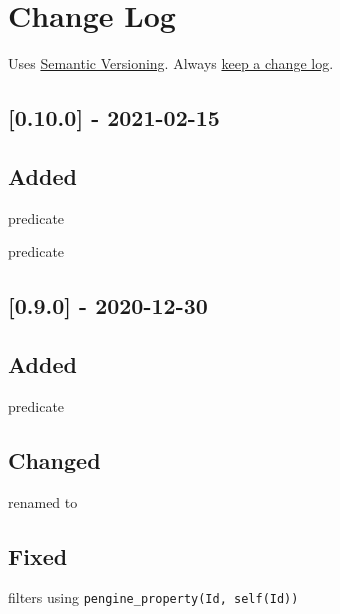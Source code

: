 \chapter{Change Log}

Uses \href{https://semver.org/}{Semantic Versioning}. Always \href{https://keepachangelog.com/en/1.0.0/}{keep a change
log}.

\section{[0.10.0] - 2021-02-15}

\section{Added}

\begin{shortlist}
    \item {} predicate
    \item {} predicate
\end{shortlist}

\section{[0.9.0] - 2020-12-30}

\section{Added}

\begin{shortlist}
    \item {} predicate
\end{shortlist}

\section{Changed}

\begin{shortlist}
    \item {} renamed to 
\end{shortlist}

\section{Fixed}

\begin{shortlist}
    \item {} filters using \verb$pengine_property(Id, self(Id))$
\end{shortlist}

